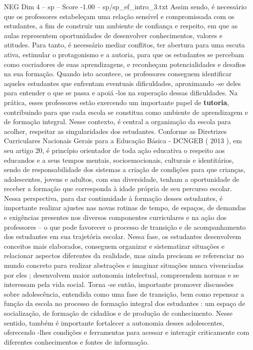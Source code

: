 \begin{textsample}{NEG Dim 4 – sp – Score -1.00 – sp/sp\_ef\_intro\_3.txt}
Assim sendo, é necessário que os professores estabeleçam uma relação sensível e compromissada com os estudantes, a fim de construir um ambiente de confiança e respeito, em que as aulas representem oportunidades de desenvolver conhecimentos, valores e atitudes.
Para tanto, é necessário mediar conflitos, ter abertura para uma escuta ativa, estimular o protagonismo e a autoria, para que os estudantes se percebam como cocriadores de suas aprendizagens, e reconheçam potencialidades e desafios na sua formação.
Quando isto acontece, os professores conseguem identificar aqueles estudantes que enfrentam eventuais dificuldades, aproximando -se deles para entender o que se passa e apoiá -los na superação dessas dificuldades.
Na prática, esses professores estão exercendo um importante papel de \textbf{tutoria}, contribuindo para que cada escola se constitua como ambiente de aprendizagem e de formação integral.
Nesse contexto, é central a organização da escola para acolher, respeitar as singularidades dos estudantes.
Conforme as Diretrizes Curriculares Nacionais Gerais para a Educação Básica - DCNGEB ( 2013 ), em seu artigo 20, é princípio orientador de toda ação educativa o respeito aos educandos e a seus tempos mentais, socioemocionais, culturais e identitários, sendo de responsabilidade dos sistemas a criação de condições para que crianças, adolescentes, jovens e adultos, com sua diversidade, tenham a oportunidade de receber a formação que corresponda à idade própria de seu percurso escolar.
Nessa perspectiva, para dar continuidade à formação desses estudantes, é importante realizar ajustes nas novas rotinas de tempo, de espaços, de demandas e exigências presentes nos diversos componentes curriculares e na ação dos professores – o que pode favorecer o processo de transição e de acompanhamento dos estudantes em sua trajetória escolar.
Nessa fase, os estudantes desenvolvem conceitos mais elaborados, conseguem organizar e sistematizar situações e relacionar aspectos diferentes da realidade, mas ainda precisam se referenciar no mundo concreto para realizar abstrações e imaginar situações nunca vivenciadas por eles ; desenvolvem maior autonomia intelectual, compreendem normas e se interessam pela vida social.
Torna -se então, importante promover discussões sobre adolescência, entendida como uma fase de transição, bem como repensar a função da escola no processo de formação integral dos estudantes : um espaço de socialização, de formação de cidadãos e de produção de conhecimento.
Nesse sentido, também é importante fortalecer a autonomia desses adolescentes, oferecendo -lhes condições e ferramentas para acessar e interagir criticamente com diferentes conhecimentos e fontes de informação.

\end{textsample}
